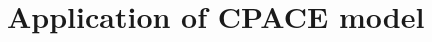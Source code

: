 
\chapter{Application of CPACE model \label{cha:application}}  %

\ifpdf
    \graphicspath{{Chapter6/Figs/Raster/}{Chapter6/Figs/PDF/}{Chapter6/Figs/}}
\else
    \graphicspath{{Chapter6/Figs/Vector/}{Chapter6/Figs/}}
\fi